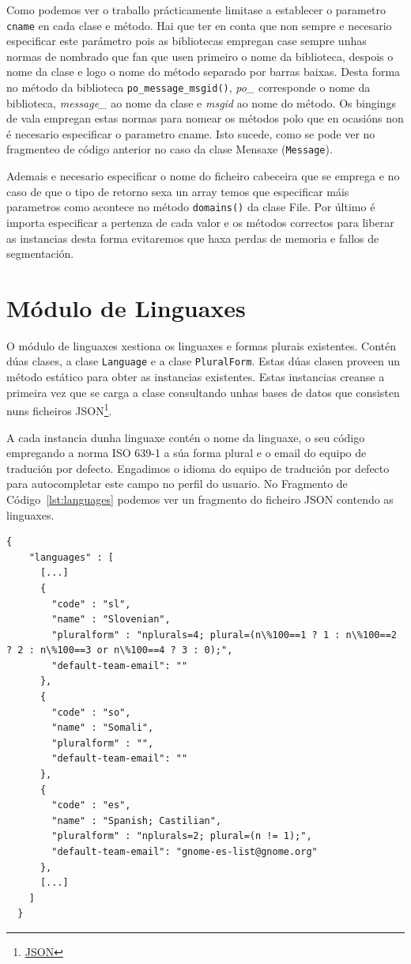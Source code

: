 Como podemos ver o traballo prácticamente limitase a establecer o parametro \lstinline{cname} en cada clase e método. Hai que ter en conta que non sempre e necesario especificar este parámetro pois as bibliotecas empregan case sempre unhas normas de nombrado que fan que usen primeiro o nome da biblioteca, despois o nome da clase e logo o nome do método separado por barras baixas. Desta forma no método da biblioteca \lstinline{po_message_msgid()}, \emph{po\_} corresponde o nome da biblioteca, \emph{message\_} ao nome da clase e \emph{msgid} ao nome do método. Os bingings de vala empregan estas normas para nomear os métodos polo que en ocasións non é necesario especificar o parametro cname. Isto sucede, como se pode ver no fragmenteo de código anterior no caso da clase Mensaxe (\lstinline{Message}).

Ademais e necesario especificar o nome do ficheiro cabeceira que se emprega e no caso de que o tipo de retorno sexa un array temos que especificar máis parametros como acontece no método \lstinline{domains()} da clase File. Por último é importa especificar a pertenza de cada valor e os métodos correctos para liberar as instancias desta forma evitaremos que haxa perdas de memoria e fallos de segmentación.

\section{Módulo de Linguaxes}
O módulo de linguaxes xestiona os linguaxes e formas plurais existentes. Contén dúas clases, a clase \lstinline{Language} e a clase \lstinline{PluralForm}. Estas dúas clasen proveen un método estático para obter as instancias existentes. Estas instancias creanse a primeira vez que se carga a clase consultando unhas bases de datos que consisten nuns ficheiros JSON\footnote{\href{http://gl.wikipedia.org/wiki/JSON}{JSON}}.

A cada instancia dunha linguaxe contén o nome da linguaxe, o seu código empregando a norma ISO 639-1 a súa forma plural e o email do equipo de tradución por defecto. Engadimos o idioma do equipo de tradución por defecto para autocompletar este campo no perfil do usuario. No Fragmento de Código~\ref{lst:languages} podemos ver un fragmento do ficheiro JSON contendo as linguaxes.

\begin{lstlisting}[label=lst:languages,caption=Fragmento da Base de Datos de Linguaxes]
  {
    "languages" : [
      [...]
      {
        "code" : "sl",
        "name" : "Slovenian",
        "pluralform" : "nplurals=4; plural=(n\%100==1 ? 1 : n\%100==2 ? 2 : n\%100==3 or n\%100==4 ? 3 : 0);",
        "default-team-email": ""
      },
      {
        "code" : "so",
        "name" : "Somali",
        "pluralform" : "",
        "default-team-email": ""
      },
      {
        "code" : "es",
        "name" : "Spanish; Castilian",
        "pluralform" : "nplurals=2; plural=(n != 1);",
        "default-team-email": "gnome-es-list@gnome.org"
      },
      [...]
    ]
  }
\end{lstlisting}

